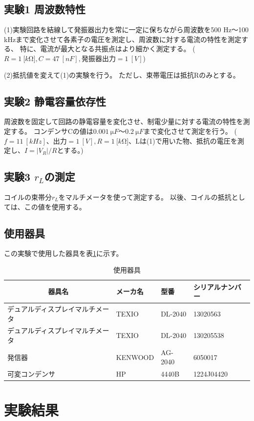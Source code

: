 \documentclass[11pt,a4paper,fleqn]{jsarticle}
\begin{document}
\subsection{実験1 周波数特性}
(1)実験回路を結線して発振器出力を常に一定に保ちながら周波数を500 Hz～100 kHzまで変化させて各素子の電圧を測定し、周波数に対する電流の特性を測定する、
特に、電流が最大となる共振点はより細かく測定する。
($R=1\ \si{[k\ohm]}, C=47\ \si{[nF]}, 発振器出力=1\ \si{[V]}$)

(2)抵抗値を変えて(1)の実験を行う。
ただし、束帯電圧は抵抗Rのみとする。
\subsection{実験2 静電容量依存性}
周波数を固定して回路の静電容量を変化させ、制電少量に対する電流の特性を測定する。
コンデンサCの値は$0.001\ \si{\micro F}～0.2\ \si{\micro F}$まで変化させて測定を行う。
($f=11\ \si{[kHz]}、出力=1\ \si{[V]}, R=1\ \si{[k\ohm]}、$Lは(1)で用いた物、抵抗の電圧を測定し、$I=|V_{R}|/R$とする。)
\subsection{実験3 $r_{L}$の測定}
コイルの束帯分$r_{L}$をマルチメータを使って測定する。
以後、コイルの抵抗としては、この値を使用する。

\subsection{使用器具}
この実験で使用した器具を表\ref{cal:item}に示す。
\begin{table}[!h]
\centering
\caption{使用器具}
\label{cal:item}
\begin{tabular}{|l|l|l|l|}
\hline
\multicolumn{1}{|c|}{器具名} & メーカ名    & 型番      & シリアルナンバー   \\ \hline
デュアルディスプレイマルチメータ          & TEXIO   & DL-2040 & 13020563   \\ \hline
デュアルディスプレイマルチメータ          & TEXIO   & DL-2040 & 130205538  \\ \hline
発信器                       & KENWOOD & AG-2040 & 6050017    \\ \hline
可変コンデンサ                   & HP      & 4440B   & 1224J04420 \\ \hline
\end{tabular}
\end{table}
%
\section{実験結果}
\end{document}
